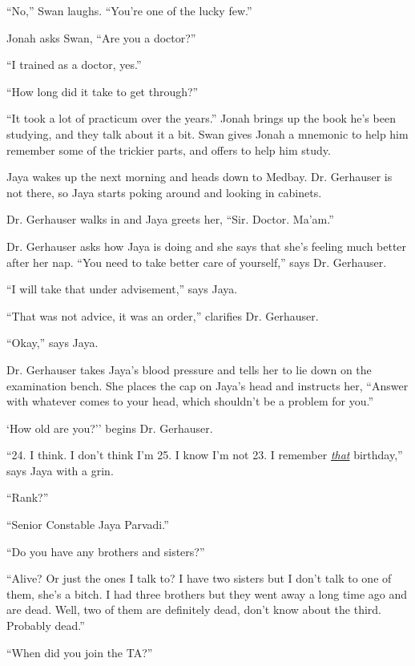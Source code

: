 ``No,'' Swan laughs. ``You're one of the lucky few.''

Jonah asks Swan, ``Are you a doctor?''

``I trained as a doctor, yes.''

``How long did it take to get through?''

``It took a lot of practicum over the years.'' Jonah brings up the book he's been studying, and they talk about it a bit.  Swan gives Jonah a mnemonic to help him remember some of the trickier parts, and offers to help him study.



Jaya wakes up the next morning and heads down to Medbay.  Dr. Gerhauser is not there, so Jaya starts poking around and looking in cabinets.



Dr. Gerhauser walks in and Jaya greets her, ``Sir. Doctor.  Ma'am.''

Dr. Gerhauser asks how Jaya is doing and she says that she's feeling much better after her nap.  ``You need to take better care of yourself,'' says Dr. Gerhauser.

``I will take that under advisement,'' says Jaya.

``That was not advice, it was an order,'' clarifies Dr. Gerhauser.

``Okay,'' says Jaya.



Dr. Gerhauser takes Jaya's blood pressure and tells her to lie down on the examination bench.  She places the cap on Jaya's head and instructs her, ``Answer with whatever comes to your head, which shouldn't be a problem for you.''

`How old are you?'' begins Dr. Gerhauser.

``24.  I think.  I don't think I'm 25.  I know I'm not 23. I remember \underline{\textit{that}} birthday,'' says Jaya with a grin.

``Rank?''

``Senior Constable Jaya Parvadi.''

``Do you have any brothers and sisters?''

``Alive?  Or just the ones I talk to?  I have two sisters but I don't talk to one of them, she's a bitch.  I had three brothers but they went away a long time ago and are dead.  Well, two of them are definitely dead, don't know about the third. Probably dead.''

``When did you join the TA?''

